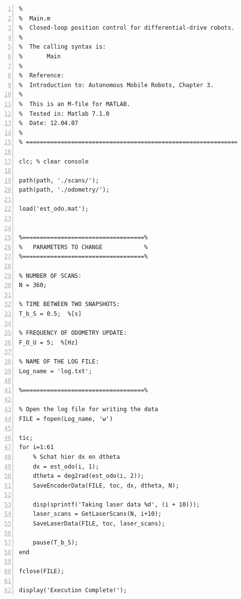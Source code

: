 \documentclass[a4paper]{article}
\begin{document}
\begin{lstlisting}[caption= logger/MainOffline.m, label=lst:checkconcat, numbers=left]
% =================================================================
% 
%  Main.m
%  Closed-loop position control for differential-drive robots.
% 
%  The calling syntax is:
%       Main
%
%  Reference:
%  Introduction to: Autonomous Mobile Robots, Chapter 3.
% 
%  This is an M-file for MATLAB.  
%  Tested in: Matlab 7.1.0
%  Date: 12.04.07
%
% =================================================================*/

clc; % clear console

path(path, './scans/');
path(path, './odometry/');

load('est_odo.mat');


%===================================%
%   PARAMETERS TO CHANGE            %
%===================================%

% NUMBER OF SCANS:
N = 360;

% TIME BETWEEN TWO SNAPSHOTS:
T_b_S = 0.5;  %[s]

% FREQUENCY OF ODOMETRY UPDATE:
F_O_U = 5;  %[Hz]

% NAME OF THE LOG FILE:
Log_name = 'log.txt';

%===================================%

% Open the log file for writing the data
FILE = fopen(Log_name, 'w')

tic;
for i=1:61
    % Schat hier dx en dtheta
    dx = est_odo(i, 1);
    dtheta = deg2rad(est_odo(i, 2));
    SaveEncoderData(FILE, toc, dx, dtheta, N);

    disp(sprintf('Taking laser data %d', (i + 10)));
    laser_scans = GetLaserScans(N, i+10);
    SaveLaserData(FILE, toc, laser_scans); 
    
    pause(T_b_S);
end

fclose(FILE);

display('Execution Complete!');
\end{lstlisting}
\end{document}

